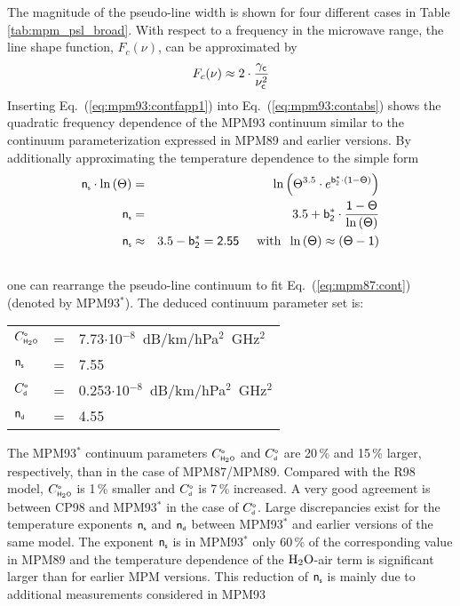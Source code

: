 The magnitude of the pseudo-line width is shown for four different 
cases in Table\,\ref{tab:mpm_psl_broad}. With respect to a frequency
in the microwave range, the line shape function, $F_c(\nu)$, can be 
approximated by
\begin{equation}
 \label{eq:mpm93:contfapp1}
 F_c(\nu) \approx 2 \cdot \frac{\gamma_{\sf c}}{\nu_{\sf c}^2}
\end{equation}
Inserting Eq.~(\ref{eq:mpm93:contfapp1}) into Eq.~(\ref{eq:mpm93:contabs})
shows the quadratic frequency dependence of the MPM93 continuum
similar to the continuum parameterization expressed in MPM89 and earlier 
versions. By additionally approximating the temperature dependence to the 
simple form
\begin{eqnarray}
  \xs\cdot\ln{(\Theta)} & = & 
  \ln{\left(\Theta^{3.5} \cdot e^{\bzks\cdot(1-\Theta)}\right)}\nonumber\\
%
  \xs  & = & 3.5 +
  \bzks\cdot\frac{1-\Theta}{\ln{(\Theta)}}\nonumber\\
%
  \xs & \approx & 3.5 -\bzks = 2.55\hspace*{5mm}\mbox{with}\hspace*{2mm}
                 \ln{(\Theta)}\approx(\Theta-1)\\
\nonumber
\end{eqnarray}
one can rearrange the pseudo-line continuum to fit Eq.~(\ref{eq:mpm87:cont})
(denoted by MPM93$^*$). The deduced continuum parameter set is:
\begin{tabular}{lcl}
 $C^{\mbox{\tiny \sf o}}_{\mbox{\tiny \sf H}_{2}\mbox{\tiny \sf O}}$  & = & 7.73$\cdot$10$^{-8}$~dB/km/hPa$^2$~GHz$^2$\\
 ${\sf n}_{\mbox{\tiny \sf s}}$   & = & 7.55\\
 $C^{\mbox{\tiny \sf o}}_{\mbox{\tiny \sf d}}$  & = & 0.253$\cdot$10$^{-8}$~dB/km/hPa$^2$~GHz$^2$\\ 
 ${\sf n}_{\mbox{\tiny \sf d}}$   & = & 4.55 \\
\end{tabular}
The MPM93$^*$ continuum parameters $C^{\mbox{\tiny \sf o}}_{\mbox{\tiny \sf H}_{2}\mbox{\tiny \sf O}}$ and $C^{\mbox{\tiny \sf o}}_{\mbox{\tiny \sf d}}$ are 20\,\% and 
15\,\% larger, respectively, than in the case of MPM87/MPM89. 
Compared with the R98 model, $C^{\mbox{\tiny \sf o}}_{\mbox{\tiny \sf H}_{2}\mbox{\tiny \sf O}}$ is 1\,\% smaller and
$C^{\mbox{\tiny \sf o}}_{\mbox{\tiny \sf d}}$ is 7\,\% increased. A very good agreement is between CP98 and
MPM93$^*$ in the case of $C^{\mbox{\tiny \sf o}}_{\mbox{\tiny \sf d}}$. Large discrepancies exist for the
temperature exponents ${\sf n}_{\mbox{\tiny \sf s}}$ and ${\sf n}_{\mbox{\tiny \sf d}}$ between MPM93$^*$ and earlier
versions of the same model. The exponent ${\sf n}_{\mbox{\tiny \sf s}}$ is in MPM93$^*$ only
60\,\% of the corresponding value in MPM89 and the temperature
dependence of the $\mbox{H}_2\mbox{O}$-air term is significant larger than for
earlier MPM versions. This reduction of ${\sf n}_{\mbox{\tiny \sf s}}$ is mainly due to 
additional measurements considered in MPM93 
